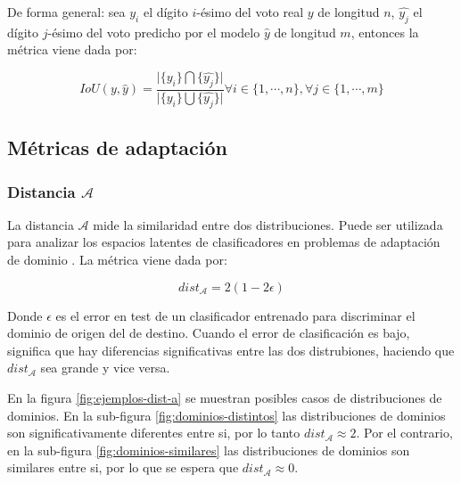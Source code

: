 De forma general: sea $y_{i}$ el d\'igito $i$-\'esimo del voto real $y$ de longitud $n$, $\hat{y_{j}}$ el d\'igito
$j$-\'esimo del voto predicho por el modelo $\hat{y}$ de longitud $m$, entonces la m\'etrica viene dada por:

\begin{equation}
    IoU(y, \hat{y}) = \frac{\lvert \{y_{i}\} \bigcap \{\hat{y_{j}}\}\rvert}{\lvert \{y_{i}\} \bigcup \{\hat{y_{j}}\}\rvert} \forall i \in \{1, \cdots, n\}, \forall j \in \{1, \cdots, m\}
\end{equation}

\subsection{Métricas de adaptación}
\subsubsection{Distancia $\mathcal{A}$}

La distancia $\mathcal{A}$ mide la similaridad entre dos distribuciones. Puede ser utilizada para analizar los espacios
latentes de clasificadores en problemas de adaptaci\'on de dominio \parencite{ben2006analysis}. La m\'etrica viene dada por:

\begin{equation}
    dist_\mathcal{A} = 2 (1-2\epsilon)
\end{equation}

Donde $\epsilon$ es el error en test de un clasificador entrenado para discriminar el dominio de origen del de destino.
Cuando el error de clasificaci\'on es bajo, significa que hay diferencias significativas entre las dos distrubiones,
haciendo que $dist_\mathcal{A}$ sea grande y vice versa.

En la figura \ref{fig:ejemplos-dist-a} se muestran posibles casos de distribuciones de dominios. En la sub-figura
\ref{fig:dominios-distintos} las distribuciones de dominios son significativamente diferentes entre si, por lo tanto
$dist_\mathcal{A} \approx 2$. Por el contrario, en la sub-figura \ref{fig:dominios-similares} las distribuciones de
dominios son similares entre si, por lo que se espera que $dist_\mathcal{A} \approx 0$.


